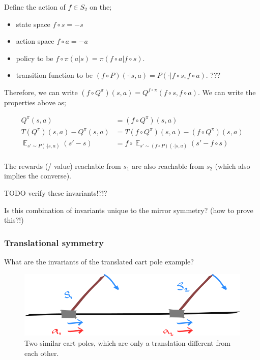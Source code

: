 Define the action of $f \in S_2$ on the;

\begin{itemize}
	\tightlist
	\item state space $f \circ s = -s$
	\item action space $f \circ a = -a$
 	\item policy to be $f \circ \pi(a | s) = \pi(f \circ a | f \circ s)$.
	\item transition function to be $(f \circ P)(\cdot | s, a) = P(\cdot| f \circ s, f \circ a)$. ???
\end{itemize}

Therefore, we can write $(f \circ Q^{\pi})(s, a) = Q^{f \circ \pi}(f \circ s, f \circ a)$.
We can write the properties above as;

\begin{align*}
Q^\pi(s, a) &= (f \circ Q^{\pi})(s, a) \tag{expected return}\\
T(Q^\pi)(s,a) - Q^\pi(s,a) &=T(f \circ Q^\pi)(s, a) - (f \circ Q^\pi)(s,a) \tag{Bellman residual}\\
\mathop{\mathbb E}_{s' \sim P(\cdot| s, a)} (s' - s) &= f \circ \mathop{\mathbb E}_{s' \sim (f \circ P)(\cdot| s, a)} (s' - f \circ s) \tag{change in state}\\
\end{align*}
\footnotemark[14]

The rewards (/ value) reachable from $s_1$ are also reachable from $s_2$ (which also implies the converse).

{\color{red}TODO verify these invariants!?!?}

Is this combination of invariants unique to the mirror symmetry? (how to prove this?!)

\subsubsection{Translational symmetry}

What are the invariants of the translated cart pole example?

\begin{figure}[h!]
\centering
\includegraphics[width=1\textwidth,height=0.25\textheight]{../../pictures/drawings/cart-pole-translation.png}
\caption{Two similar cart poles, which are only a translation different from each other.}
\end{figure}

